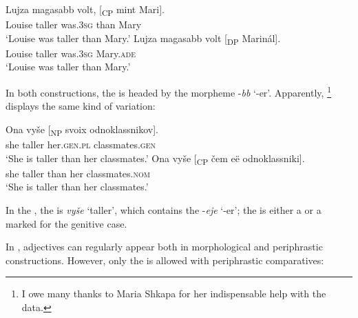 \ea \label{lujza2}
\ea \gll Lujza magasabb volt, [\textsubscript{CP} mint Mari].\\
Louise taller was.\textsc{3sg} \phantom{} than Mary\\
\glt `Louise was taller than Mary.'
\ex \gll Lujza magasabb volt [\textsubscript{DP}	Marinál].\\
Louise taller was.\textsc{3sg} {} Mary.\textsc{ade}\\
\glt `Louise was taller than Mary.'
\z
\z

In both constructions, the  is headed by the morpheme -\textit{bb} `-er'. Apparently, \footnote{I owe many thanks to Maria Shkapa for her indispensable help with the  data.} displays the same kind of variation:

\ea \label{russiancomp}
\ea \gll Ona vyše [\textsubscript{NP} svoix	odnoklassnikov]. \label{russiangen}\\
she taller {}	her.\textsc{gen.pl} classmates.\textsc{gen}\\
\glt `She is taller than her classmates.'
\ex \gll Ona vyše	[\textsubscript{CP} čem eë odnoklassniki].\\
she	taller {} than her classmates.\textsc{nom}\\
\glt `She is taller than her classmates.'
\z
\z

In the , the  is \textit{vyše} `taller', which contains the  -\textit{eje} `-er'; the  is either a  or a  marked for the genitive case.

In , adjectives can regularly appear both in morphological and periphrastic constructions. However, only the   is allowed with periphrastic comparatives:

\ea \label{russianselection}
\z
\z

